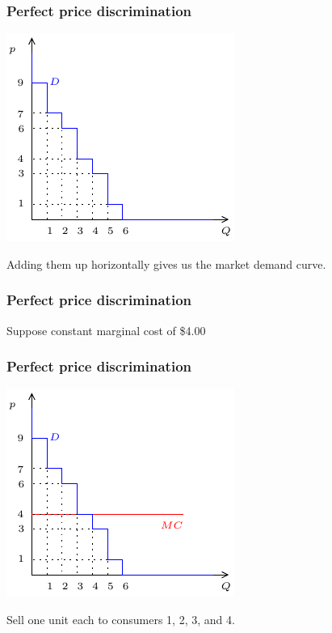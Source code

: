 \documentclass[xcolor=pdftex,dvipsnames]{beamer}
\begin{document}
\begin{frame}
  \frametitle{Perfect price discrimination}
  \begin{center}
    \includegraphics{pics/PriceDiscrimination2}
  \end{center}
Adding them up horizontally gives us the market demand curve.
\end{frame}


\begin{frame}
\frametitle{Perfect price discrimination}
Suppose constant marginal cost of \$4.00
\bigskip


\bigskip
{}

\bigskip
{}

\bigskip
{}
\end{frame}

\begin{frame}
\frametitle{Perfect price discrimination}
\begin{center}
  \includegraphics{pics/Pricediscrimination3}
\end{center}
Sell one unit each  to consumers 1, 2,  3, and 4. 
\end{frame}
\end{document}
